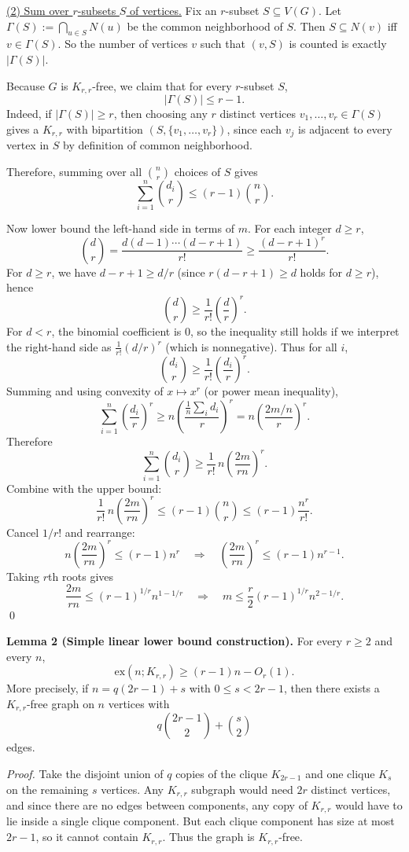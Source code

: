 \underline{(2) Sum over $r$-subsets $S$ of vertices.}
Fix an $r$-subset $S\subseteq V(G)$. Let $\Gamma(S):=\bigcap_{u\in S} N(u)$ be the common neighborhood of $S$.
Then $S\subseteq N(v)$ iff $v\in\Gamma(S)$. So the number of vertices $v$ such that $(v,S)$ is counted is exactly $|\Gamma(S)|$.

Because $G$ is $K_{r,r}$-free, we claim that for every $r$-subset $S$,
\[
|\Gamma(S)|\le r-1.
\]
Indeed, if $|\Gamma(S)|\ge r$, then choosing any $r$ distinct vertices $v_1,\dots,v_r\in\Gamma(S)$ gives a $K_{r,r}$ with bipartition $(S,\{v_1,\dots,v_r\})$, since each $v_j$ is adjacent to every vertex in $S$ by definition of common neighborhood.

Therefore, summing over all $\binom{n}{r}$ choices of $S$ gives
\[
\sum_{i=1}^n \binom{d_i}{r} \le (r-1)\binom{n}{r}.
\]

Now lower bound the left-hand side in terms of $m$.
For each integer $d\ge r$,
\[
\binom{d}{r}=\frac{d(d-1)\cdots(d-r+1)}{r!}\ge \frac{(d-r+1)^r}{r!}.
\]
For $d\ge r$, we have $d-r+1\ge d/r$ (since $r(d-r+1)\ge d$ holds for $d\ge r$), hence
\[
\binom{d}{r} \ge \frac{1}{r!}\left(\frac{d}{r}\right)^r.
\]
For $d<r$, the binomial coefficient is $0$, so the inequality still holds if we interpret the right-hand side as $\frac{1}{r!}(d/r)^r$ (which is nonnegative).
Thus for all $i$,
\[
\binom{d_i}{r}\ge \frac{1}{r!}\left(\frac{d_i}{r}\right)^r.
\]
Summing and using convexity of $x\mapsto x^r$ (or power mean inequality),
\[
\sum_{i=1}^n \left(\frac{d_i}{r}\right)^r \ge n\left(\frac{\frac1n\sum_i d_i}{r}\right)^r = n\left(\frac{2m/n}{r}\right)^r.
\]
Therefore
\[
\sum_{i=1}^n \binom{d_i}{r} \ge \frac{1}{r!}\, n\left(\frac{2m}{rn}\right)^r.
\]
Combine with the upper bound:
\[
\frac{1}{r!}\, n\left(\frac{2m}{rn}\right)^r \le (r-1)\binom{n}{r} \le (r-1)\frac{n^r}{r!}.
\]
Cancel $1/r!$ and rearrange:
\[
 n\left(\frac{2m}{rn}\right)^r \le (r-1)n^r
\quad\Longrightarrow\quad
\left(\frac{2m}{rn}\right)^r \le (r-1)n^{r-1}.
\]
Taking $r$th roots gives
\[
\frac{2m}{rn} \le (r-1)^{1/r} n^{1-1/r}
\quad\Longrightarrow\quad
m \le \frac{r}{2}(r-1)^{1/r} n^{2-1/r}.
\]
\qed

\medskip
\textbf{Lemma 2 (Simple linear lower bound construction).}
For every $r\ge 2$ and every $n$,
\[
\mathrm{ex}(n;K_{r,r}) \ge (r-1)n - O_r(1).
\]
More precisely, if $n=q(2r-1)+s$ with $0\le s<2r-1$, then there exists a $K_{r,r}$-free graph on $n$ vertices with
\[
q\binom{2r-1}{2}+\binom{s}{2}
\]
edges.

\emph{Proof.}
Take the disjoint union of $q$ copies of the clique $K_{2r-1}$ and one clique $K_s$ on the remaining $s$ vertices.
Any $K_{r,r}$ subgraph would need $2r$ distinct vertices, and since there are no edges between components, any copy of $K_{r,r}$ would have to lie inside a single clique component.
But each clique component has size at most $2r-1$, so it cannot contain $K_{r,r}$.
Thus the graph is $K_{r,r}$-free.

